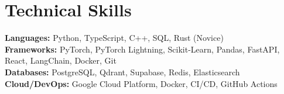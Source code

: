 \section{Technical Skills}
 \begin{itemize}[leftmargin=0.0in, label={}]
    \small{\item{
     \textbf{\normalsize{Languages:}}{ \normalsize{Python, TypeScript, C++, SQL, Rust (Novice)}} \\
     \vspace{4pt}
     \textbf{\normalsize{Frameworks:}}{ \normalsize{PyTorch, PyTorch Lightning, Scikit-Learn, Pandas, FastAPI, React, LangChain, Docker, Git}} \\
     \vspace{4pt}
     \textbf{\normalsize{Databases:}}{ \normalsize{PostgreSQL, Qdrant, Supabase, Redis, Elasticsearch}} \\
     \vspace{4pt}
     \textbf{\normalsize{Cloud/DevOps:}}{ \normalsize{Google Cloud Platform, Docker, CI/CD, GitHub Actions}}
    }}
    
 \end{itemize}